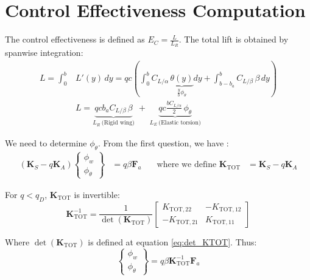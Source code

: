 \renewcommand{\parttitle}{Control Effectiveness Computation}
\section*{\parttitle}

The control effectiveness is defined as $E_C = \frac{L}{L_R}$. The total lift is obtained by spanwise integration:
\begin{align}
L = \int_0^b &L'(y)\,dy
= q c \left(
\int_0^b C_{L/\alpha}\,
\underbrace{\theta(y)}_{\frac{y}{b} \phi_\theta}
dy
+ \int_{b-b_a}^{b} C_{L/\beta}\,\beta\,dy
\right) \nonumber \\[8pt]
&\boxed{L = \underbrace{q c b_a C_{L/\beta}\,\beta}_{\displaystyle L_R\ \text{(Rigid wing)}}
\;+\;
\underbrace{q c \frac{b C_{L/\alpha}}{2}\,\phi_\theta}_{\displaystyle L_E\ \text{(Elastic torsion)}}}
\end{align}

\vspace{0.5cm}

We need to determine $\phi_\theta$. From the first question, we have :
\begin{equation}
\begin{aligned}
\left( \mathbf{K}_S - q \mathbf{K}_A \right)
\begin{Bmatrix}
\phi_w \\
\phi_\theta
\end{Bmatrix}
&= q \beta \mathbf{F}_a
\quad &
\text{where we define } \mathbf{K}_{\mathrm{TOT}} &= \mathbf{K}_S - q \mathbf{K}_A
\end{aligned}
\end{equation}

For $q < q_D$, $\mathbf{K}_{\mathrm{TOT}}$ is invertible:
\begin{equation}
\mathbf{K}_{\mathrm{TOT}}^{-1}
=
\frac{1}{\det(\mathbf{K}_{\mathrm{TOT}})}
\begin{bmatrix}
K_{\mathrm{TOT},22} & -K_{\mathrm{TOT},12} \\
-K_{\mathrm{TOT},21} & K_{\mathrm{TOT},11}
\end{bmatrix}
\end{equation}

Where $\det(\mathbf{K}_{\mathrm{TOT}})$ is defined at equation \eqref{eq:det_KTOT}. Thus:
\begin{equation}
\begin{Bmatrix}
\phi_w \\
\phi_\theta
\end{Bmatrix}
=
q \beta \mathbf{K}_{\mathrm{TOT}}^{-1} \mathbf{F}_a
\end{equation}

